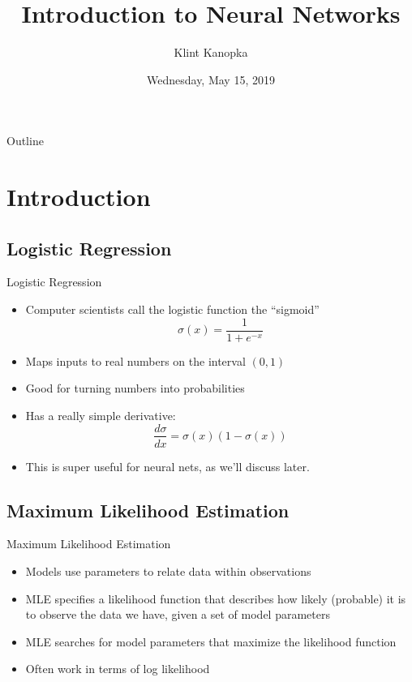 \documentclass{beamer}
\title[NN Workshop]{Introduction to Neural Networks}
\author{Klint Kanopka}
\institute{kkanopka@stanford.edu}
\date{Wednesday, May 15, 2019}
\begin{document}
    \begin{frame}
      \titlepage
    \end{frame}
    
    \begin{frame}{Outline}
      \tableofcontents
    \end{frame}
    
    \section{Introduction}
    
        \subsection{Logistic Regression}
            \begin{frame}{Logistic Regression}
                \begin{itemize}
                    \item<2-> Computer scientists call the logistic function the ``sigmoid''
                    $$ \sigma(x)= \frac{1}{1+e^{-x}} $$
                    \item<3-> Maps inputs to real numbers on the interval $(0,1)$
                    \item<4-> Good for turning numbers into probabilities
                    \item<5-> Has a really simple derivative:
                    $$ \frac{d\sigma}{dx} = \sigma(x)(1-\sigma(x)) $$
                    \item<6-> This is super useful for neural nets, as we'll discuss later.
                \end{itemize}
            \end{frame}
        \subsection{Maximum Likelihood Estimation}
            \begin{frame}{Maximum Likelihood Estimation}
                \begin{itemize}
                    \item<2-> Models use parameters to relate data within observations
                    \item<3-> MLE specifies a likelihood function that describes how likely (probable) it is to observe the data we have, given a set of model parameters
                    \item<4-> MLE searches for model parameters that maximize the likelihood function
                    \item<5-> Often work in terms of log likelihood
                \end{itemize}
            \end{frame}
        
\end{document}
